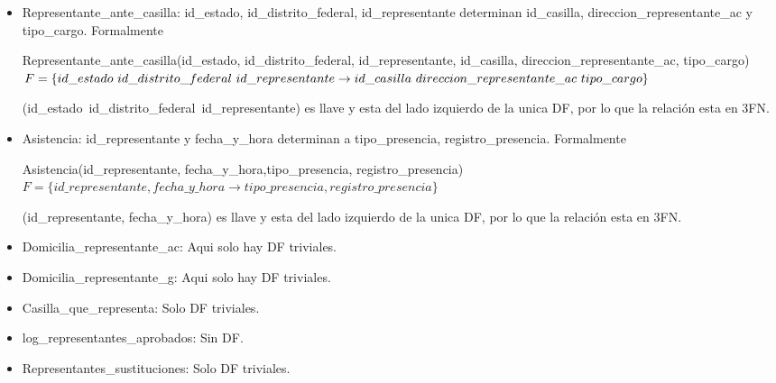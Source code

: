 \documentclass[a4paper,twoside,11pt]{article}
\begin{document}
\begin{itemize}
  \item Representante\_ante\_casilla: id\_estado, id\_distrito\_federal, id\_representante determinan
        id\_casilla, direccion\_representante\_ac y tipo\_cargo. Formalmente

        Representante\_ante\_casilla(id\_estado, id\_distrito\_federal, id\_representante,
        id\_casilla, direccion\_representante\_ac, tipo\_cargo)\\
        $F=\{id\_estado~id\_distrito\_federal~id\_representante\rightarrow\\
        id\_casilla~direccion\_representante\_ac~tipo\_cargo\}$

        (id\_estado~id\_distrito\_federal~id\_representante) es llave y esta del lado izquierdo de la unica DF,
        por lo que la relación esta en 3FN.

  \item Asistencia: id\_representante y fecha\_y\_hora determinan a tipo\_presencia, registro\_presencia. Formalmente

        Asistencia(id\_representante, fecha\_y\_hora,tipo\_presencia, registro\_presencia)\\
        $F=\{id\_representante, fecha\_y\_hora \rightarrow tipo\_presencia, registro\_presencia\}$

        (id\_representante, fecha\_y\_hora) es llave y esta del lado izquierdo de la unica DF,
        por lo que la relación esta en 3FN.
        
  \item Domicilia\_representante\_ac: Aqui solo hay DF triviales.
  \item Domicilia\_representante\_g: Aqui solo hay DF triviales.
  \item Casilla\_que\_representa: Solo DF triviales.
  \item log\_representantes\_aprobados: Sin DF.
  \item Representantes\_sustituciones: Solo DF triviales.

\end{itemize}
\end{document}
